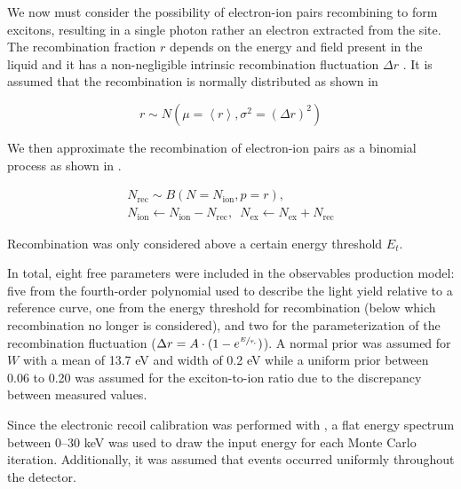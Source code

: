 We now must consider the possibility of electron-ion pairs recombining to form excitons, resulting in a single photon rather an electron extracted from the site.  The recombination fraction $r$ depends on the energy and field present in the liquid and it has a non-negligible intrinsic recombination fluctuation $\Delta r$ \cite{akerib2016tritium, aprile2017tritium}.  It is assumed that the recombination is normally distributed as shown in 

\begin{equation}
        \label{eqn:xe1t_recombination_fluc}
        r \sim N(\mu = \left< r \right>, \sigma^2 = (\Delta r)^2)
\end{equation}

We then approximate the recombination of electron-ion pairs as a binomial process as shown in .

\begin{equation}
        \label{eqn:xe1t_recombination}
        \begin{gathered}
                N_{\textrm{rec}} \sim B(N = N_{\textrm{ion}}, p = r), \\ 
                N_{\textrm{ion}} \leftarrow N_{\textrm{ion}} - N_{\textrm{rec}}, \, \, \,  N_{\textrm{ex}} \leftarrow N_{\textrm{ex}} + N_{\textrm{rec}}
        \end{gathered}
\end{equation}


Recombination was only considered above a certain energy threshold $E_t$.  

In total, eight free parameters were included in the observables production model: five from the fourth-order polynomial used to describe the light yield relative to a reference curve, one from the energy threshold for recombination (below which recombination no longer is considered), and two for the parameterization of the recombination fluctuation ($\Delta r = A \cdot (1 - e^{\sfrac{E}{\tau_r}})$).  A normal prior was assumed for $W$ with a mean of 13.7 eV and width of 0.2 eV while a uniform prior between 0.06 to 0.20 \cite{takahashi1975average, aprile2007observation} was assumed for the exciton-to-ion ratio due to the discrepancy between measured values.  



Since the electronic recoil calibration was performed with , a flat energy spectrum between 0--30 keV was used to draw the input energy for each Monte Carlo iteration.  Additionally, it was assumed that events occurred uniformly throughout the detector.



